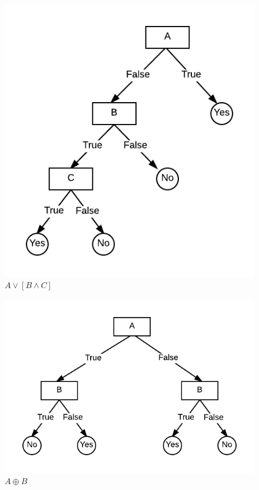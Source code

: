 \documentclass[12pt]{article}
\begin{document}
\begin{figure}[H]
  \centering
  \includegraphics[scale=0.5]{img/hw1_2b}
  \caption{$A\vee\left[ B\wedge C \right]$}
\end{figure}

\begin{figure}[H]
  \centering
  \includegraphics[scale=0.5]{img/hw1_2c}
  \caption{$A\oplus B$}
\end{figure}
\end{document}
